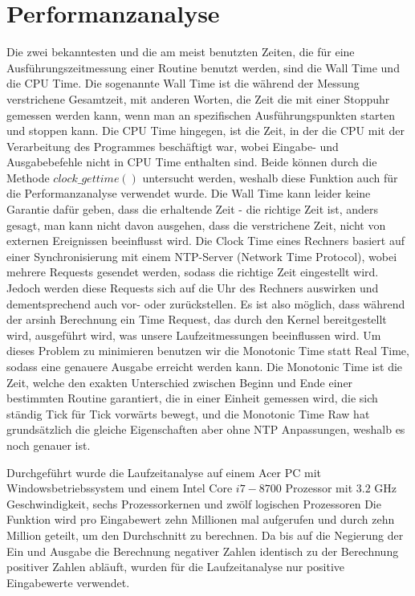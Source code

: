 \documentclass[course=erap]{aspdoc}
\begin{document}
 \section{Performanzanalyse}
 
Die zwei bekanntesten und die am meist benutzten Zeiten, die für eine Ausführungszeitmessung einer Routine benutzt werden, sind die Wall Time und die CPU Time. 
Die sogenannte Wall Time ist die während der Messung verstrichene Gesamtzeit, mit anderen Worten, die Zeit die mit einer Stoppuhr gemessen werden kann, wenn man an spezifischen Ausführungspunkten starten und stoppen kann. Die CPU Time hingegen, ist die Zeit, in der die CPU mit der Verarbeitung des Programmes beschäftigt war, wobei Eingabe- und Ausgabebefehle  nicht in CPU Time enthalten sind.
Beide können durch die Methode $clock\_gettime()$ untersucht werden, weshalb diese Funktion auch für die Performanzanalyse verwendet wurde. Die Wall Time kann leider keine Garantie dafür geben, dass die erhaltende Zeit - die richtige Zeit ist, anders gesagt, man kann nicht davon ausgehen, dass die verstrichene Zeit, nicht von externen Ereignissen beeinflusst wird. Die Clock Time eines Rechners basiert  auf einer Synchronisierung mit einem NTP-Server (Network Time Protocol), wobei mehrere Requests gesendet werden, sodass die richtige Zeit eingestellt wird. Jedoch werden diese Requests sich auf die Uhr des Rechners auswirken und dementsprechend auch vor- oder zurückstellen. Es ist also möglich, dass während der arsinh Berechnung ein Time Request, das durch den Kernel bereitgestellt wird, ausgeführt wird, was unsere Laufzeitmessungen beeinflussen wird. Um dieses Problem zu minimieren benutzen wir die Monotonic Time statt Real Time, sodass eine genauere Ausgabe erreicht werden kann. 
Die Monotonic Time ist die Zeit, welche den exakten Unterschied zwischen Beginn und Ende einer bestimmten Routine garantiert, die in einer Einheit gemessen wird, die sich ständig Tick für Tick vorwärts bewegt, und die Monotonic Time Raw hat grundsätzlich die gleiche Eigenschaften aber ohne NTP Anpassungen, weshalb es noch genauer ist.

Durchgeführt wurde die Laufzeitanalyse auf einem Acer PC mit Windowsbetriebssystem und einem Intel Core $i7-8700$ Prozessor mit $3.2$ GHz Geschwindigkeit, sechs Prozessorkernen und zwölf logischen Prozessoren Die Funktion wird pro Eingabewert zehn Millionen mal aufgerufen und durch zehn Million geteilt, um den Durchschnitt zu berechnen. Da bis auf die Negierung der Ein und Ausgabe die Berechnung negativer Zahlen identisch zu der Berechnung positiver Zahlen abläuft, wurden für die Laufzeitanalyse nur positive Eingabewerte verwendet.
\end{document}
